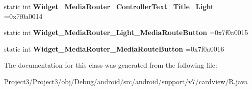 \begin{DoxyCompactItemize}
\mbox{\label{classandroid_1_1support_1_1v7_1_1cardview_1_1R_1_1style_a9147dcfa448ecf22cf2257821e2ffdc9}} 
static int {\bfseries Widget\+\_\+\+Media\+Router\+\_\+\+Controller\+Text\+\_\+\+Title\+\_\+\+Light} =0x7f0a0014
\item 
\mbox{\label{classandroid_1_1support_1_1v7_1_1cardview_1_1R_1_1style_a4af56344da770e56f04103e7fe91d751}} 
static int {\bfseries Widget\+\_\+\+Media\+Router\+\_\+\+Light\+\_\+\+Media\+Route\+Button} =0x7f0a0015
\item 
\mbox{\label{classandroid_1_1support_1_1v7_1_1cardview_1_1R_1_1style_a243625df74362e1ad63829a67de9cadc}} 
static int {\bfseries Widget\+\_\+\+Media\+Router\+\_\+\+Media\+Route\+Button} =0x7f0a0016
\end{DoxyCompactItemize}


The documentation for this class was generated from the following file\+:\begin{DoxyCompactItemize}
\item 
Project3/\+Project3/obj/\+Debug/android/src/android/support/v7/cardview/R.\+java\end{DoxyCompactItemize}
